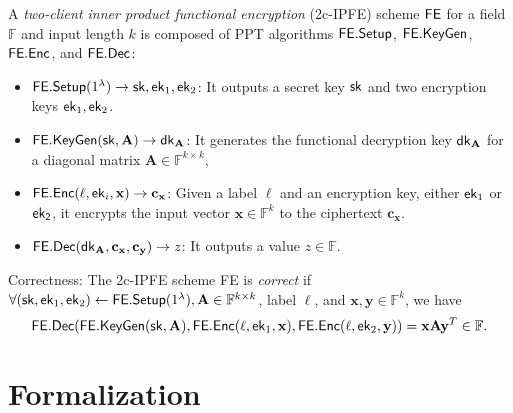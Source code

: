 \begin{definition}
\label{def:2c-IPFE}
	A \emph{two-client inner product functional encryption} (2c-IPFE) scheme $\sf FE$ for a field $\mathbb{F}$ and input length $k$ is composed of PPT algorithms ${\sf FE.Setup}$, ${\sf FE.KeyGen}$, ${\sf FE.Enc}$, and ${\sf FE.Dec}$:

	\begin{itemize}
	
		\item ${\sf FE.Setup}(1^\lambda) \to {\sf sk}, {\sf ek}_1, {\sf ek}_2$: It outputs a secret key ${\sf sk}$ and two encryption keys ${\sf ek}_1, {\sf ek}_2$.
	
		\item ${\sf FE.KeyGen}({\sf sk}, \mathbf{A}) \to {\sf dk}_\mathbf{A}$: It generates the functional decryption key ${\sf dk}_\mathbf{A}$ for a diagonal matrix $\mathbf{A} \in \mathbb{F}^{k \times k}$,  
	
		\item ${\sf FE.Enc}(\ell, {\sf ek}_i, \mathbf{x}) \to \mathbf{c_x}$: Given a label $\ell$ and an encryption key, either ${\sf ek}_1$ or ${\sf ek_2}$, it encrypts the input vector $\mathbf{x} \in \mathbb{F}^k$ to the ciphertext $\mathbf{c_x}$. 
	
		\item ${\sf FE.Dec}({\sf dk}_\mathbf{A}, \mathbf{c_x}, \mathbf{c_y}) \to z$: It outputs a value $z \in \mathbb{F}$.
	
	\end{itemize}
	
	\noindent Correctness: The 2c-IPFE scheme {\sf FE} is \emph{correct} if $\forall ({\sf sk}, {\sf ek}_1, {\sf ek}_2) \gets {\sf FE.Setup}(1^\lambda), \mathbf{A} \in \mathbb{F}^{k \times k}$, label $\ell$, and $ \mathbf{x}, \mathbf{y} \in \mathbb{F}^k$, we have
	\[
		{\sf FE.Dec}({\sf FE.KeyGen}({\sf sk},  \mathbf{A}), {\sf FE.Enc}(\ell, {\sf ek}_1, \mathbf{x}), {\sf FE.Enc}(\ell, {\sf ek}_2, \mathbf{y}) ) = \mathbf{x} \mathbf{A} \mathbf{y}^T \in \mathbb{F}.
	\]

\end{definition}



\section{Formalization}
\label{sec:formalization}


